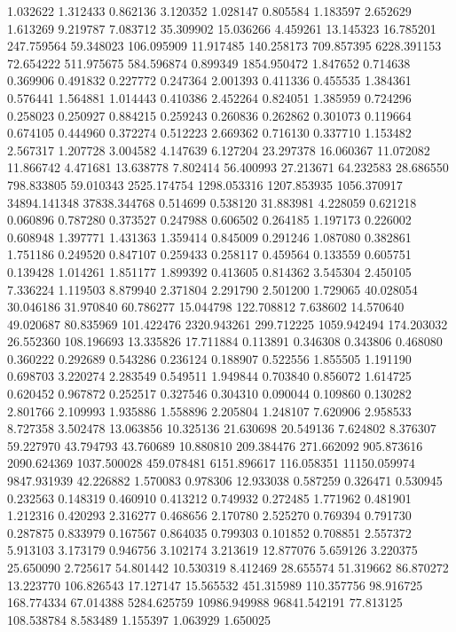 1.032622
1.312433
0.862136
3.120352
1.028147
0.805584
1.183597
2.652629
1.613269
9.219787
7.083712
35.309902
15.036266
4.459261
13.145323
16.785201
247.759564
59.348023
106.095909
11.917485
140.258173
709.857395
6228.391153
72.654222
511.975675
584.596874
0.899349
1854.950472
1.847652
0.714638
0.369906
0.491832
0.227772
0.247364
2.001393
0.411336
0.455535
1.384361
0.576441
1.564881
1.014443
0.410386
2.452264
0.824051
1.385959
0.724296
0.258023
0.250927
0.884215
0.259243
0.260836
0.262862
0.301073
0.119664
0.674105
0.444960
0.372274
0.512223
2.669362
0.716130
0.337710
1.153482
2.567317
1.207728
3.004582
4.147639
6.127204
23.297378
16.060367
11.072082
11.866742
4.471681
13.638778
7.802414
56.400993
27.213671
64.232583
28.686550
798.833805
59.010343
2525.174754
1298.053316
1207.853935
1056.370917
34894.141348
37838.344768
0.514699
0.538120
31.883981
4.228059
0.621218
0.060896
0.787280
0.373527
0.247988
0.606502
0.264185
1.197173
0.226002
0.608948
1.397771
1.431363
1.359414
0.845009
0.291246
1.087080
0.382861
1.751186
0.249520
0.847107
0.259433
0.258117
0.459564
0.133559
0.605751
0.139428
1.014261
1.851177
1.899392
0.413605
0.814362
3.545304
2.450105
7.336224
1.119503
8.879940
2.371804
2.291790
2.501200
1.729065
40.028054
30.046186
31.970840
60.786277
15.044798
122.708812
7.638602
14.570640
49.020687
80.835969
101.422476
2320.943261
299.712225
1059.942494
174.203032
26.552360
108.196693
13.335826
17.711884
0.113891
0.346308
0.343806
0.468080
0.360222
0.292689
0.543286
0.236124
0.188907
0.522556
1.855505
1.191190
0.698703
3.220274
2.283549
0.549511
1.949844
0.703840
0.856072
1.614725
0.620452
0.967872
0.252517
0.327546
0.304310
0.090044
0.109860
0.130282
2.801766
2.109993
1.935886
1.558896
2.205804
1.248107
7.620906
2.958533
8.727358
3.502478
13.063856
10.325136
21.630698
20.549136
7.624802
8.376307
59.227970
43.794793
43.760689
10.880810
209.384476
271.662092
905.873616
2090.624369
1037.500028
459.078481
6151.896617
116.058351
11150.059974
9847.931939
42.226882
1.570083
0.978306
12.933038
0.587259
0.326471
0.530945
0.232563
0.148319
0.460910
0.413212
0.749932
0.272485
1.771962
0.481901
1.212316
0.420293
2.316277
0.468656
2.170780
2.525270
0.769394
0.791730
0.287875
0.833979
0.167567
0.864035
0.799303
0.101852
0.708851
2.557372
5.913103
3.173179
0.946756
3.102174
3.213619
12.877076
5.659126
3.220375
25.650090
2.725617
54.801442
10.530319
8.412469
28.655574
51.319662
86.870272
13.223770
106.826543
17.127147
15.565532
451.315989
110.357756
98.916725
168.774334
67.014388
5284.625759
10986.949988
96841.542191
77.813125
108.538784
8.583489
1.155397
1.063929
1.650025
